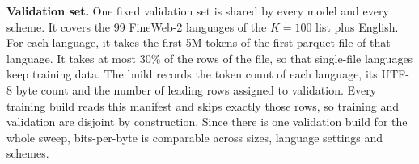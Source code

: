 \textbf{Validation set.} One fixed validation set is shared by every model and every scheme. It covers the 99 FineWeb-2 languages of the $K=100$ list plus English. For each language, it takes the first 5M tokens of the first parquet file of that language. It takes at most 30\% of the rows of the file, so that single-file languages keep training data. The build records the token count of each language, its UTF-8 byte count and the number of leading rows assigned to validation. Every training build reads this manifest and skips exactly those rows, so training and validation are disjoint by construction. Since there is one validation build for the whole sweep, bits-per-byte is comparable across sizes, language settings and schemes.

